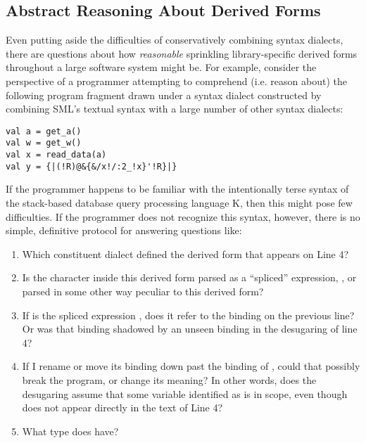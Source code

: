 \subsection{Abstract Reasoning About Derived Forms}\label{sec:abs-reasoning-intro}
Even putting aside the difficulties of conservatively combining syntax dialects, there are questions about how \emph{reasonable} sprinkling library-specific derived forms throughout a large software system might be. 
For example, consider the perspective of a programmer attempting to comprehend (i.e. reason about) the following program fragment drawn under a syntax dialect constructed by combining SML's textual syntax with a large number of other syntax dialects:
\begin{lstlisting}
val a = get_a()
val w = get_w()
val x = read_data(a)
val y = {|(!R)@&{&/x!/:2_!x}'!R}|}
\end{lstlisting}

If the programmer happens to be familiar with the intentionally terse syntax of the stack-based database query processing language K, then this might pose few difficulties. If the programmer does not recognize this syntax, however, there is no simple, definitive protocol for answering questions like:

\begin{enumerate}
\item Which constituent dialect defined the derived form that appears on Line 4?
\item Is the character  inside this derived form parsed as a ``spliced'' expression, , or parsed in some other way peculiar to this derived form?
\item If  is the spliced expression , does it refer to the binding on the previous line? Or was that binding shadowed by an unseen binding in the desugaring of line 4?
\item If I rename  or move its binding down past the binding of , could that possibly break the program, or change its meaning? In other words, does the desugaring  assume that some variable identified as  is in scope, even though  does not appear directly in the text of Line 4?
\item What type does  have?
\end{enumerate}


